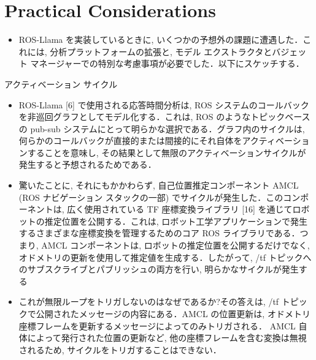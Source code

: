 
\section{Practical Considerations}
\label{sec: practical considerations}

\begin{frame}{}
    \begin{itemize}
        \item ROS-Llama を実装しているときに, いくつかの予想外の課題に遭遇した．これには, 分析プラットフォームの拡張と, モデル エクストラクタとバジェット マネージャーでの特別な考慮事項が必要でした．以下にスケッチする．
    \end{itemize}
\end{frame}

\begin{frame}{アクティベーション サイクル}
    \begin{itemize}
        \item ROS-Llama [6] で使用される応答時間分析は, ROS システムのコールバックを非巡回グラフとしてモデル化する．これは, ROS のようなトピックベースの pub-sub システムにとって明らかな選択である．グラフ内のサイクルは, 何らかのコールバックが直接的または間接的にそれ自体をアクティベーションすることを意味し, その結果として無限のアクティベーションサイクルが発生すると予想されるためである．
    \end{itemize}
\end{frame}

\begin{frame}{}
    \begin{itemize}
        \item 驚いたことに, それにもかかわらず, 自己位置推定コンポーネント AMCL (ROS ナビゲーション スタックの一部) でサイクルが発生した．このコンポーネントは, 広く使用されている TF 座標変換ライブラリ [16] を通じてロボットの推定位置を公開する．これは, ロボット工学アプリケーションで発生するさまざまな座標変換を管理するためのコア ROS ライブラリである．つまり, AMCL コンポーネントは, ロボットの推定位置を公開するだけでなく, オドメトリの更新を使用して推定値を生成する．したがって, /tf トピックへのサブスクライブとパブリッシュの両方を行い, 明らかなサイクルが発生する
    \end{itemize}
\end{frame}

\begin{frame}{}
    \begin{itemize}
        \item これが無限ループをトリガしないのはなぜであるか?その答えは, /tf トピックで公開されたメッセージの内容にある．AMCL の位置更新は, オドメトリ座標フレームを更新するメッセージによってのみトリガされる． AMCL 自体によって発行された位置の更新など, 他の座標フレームを含む変換は無視されるため, サイクルをトリガすることはできない．
    \end{itemize}
\end{frame}

